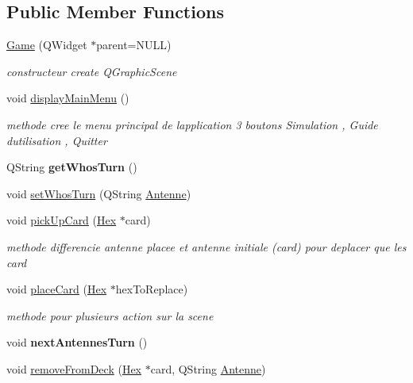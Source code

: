 \subsection*{Public Member Functions}
\begin{DoxyCompactItemize}
\item 
\mbox{\hyperlink{class_game_a32d7e09112c37ff84736ea797c1eb7f0}{Game}} (Q\+Widget $\ast$parent=N\+U\+LL)
\begin{DoxyCompactList}\small\item\em constructeur create Q\+Graphic\+Scene \end{DoxyCompactList}\item 
void \mbox{\hyperlink{class_game_af74fd203e3b31917ca9d4769fa608c48}{display\+Main\+Menu}} ()
\begin{DoxyCompactList}\small\item\em methode cree le menu principal de l\textquotesingle{}application 3 boutons Simulation , Guide d\textquotesingle{}utilisation , Quitter \end{DoxyCompactList}\item 
\mbox{\label{class_game_a82bbb20eac93665bba24f0da4bf68d27}} 
Q\+String {\bfseries get\+Whos\+Turn} ()
\item 
void \mbox{\hyperlink{class_game_aa7c694cceaeae66edda49a0e52059929}{set\+Whos\+Turn}} (Q\+String \mbox{\hyperlink{class_antenne}{Antenne}})
\item 
void \mbox{\hyperlink{class_game_af01f609e7ecc9681f63a8849eb82ef18}{pick\+Up\+Card}} (\mbox{\hyperlink{class_hex}{Hex}} $\ast$card)
\begin{DoxyCompactList}\small\item\em methode differencie antenne placee et antenne initiale (card) pour deplacer que les card \end{DoxyCompactList}\item 
void \mbox{\hyperlink{class_game_a899968e870a05be0ca685138fbe12fda}{place\+Card}} (\mbox{\hyperlink{class_hex}{Hex}} $\ast$hex\+To\+Replace)
\begin{DoxyCompactList}\small\item\em methode pour plusieurs action sur la scene \end{DoxyCompactList}\item 
\mbox{\label{class_game_a764f210df3c6afd4ba8b673b1b237cdb}} 
void {\bfseries next\+Antennes\+Turn} ()
\item 
void \mbox{\hyperlink{class_game_a14fffa93008a1b5ef00ff478c27fc34e}{remove\+From\+Deck}} (\mbox{\hyperlink{class_hex}{Hex}} $\ast$card, Q\+String \mbox{\hyperlink{class_antenne}{Antenne}})

\end{DoxyCompactItemize}
